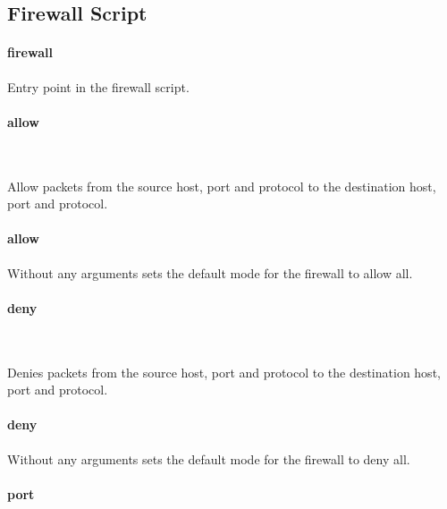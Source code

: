 \subsection{Firewall Script}

\paragraph{firewall}


Entry point in the firewall script.

\paragraph{allow}

\\
\statement*{[from [, port] [, proto]]}

Allow packets from the source host, port and protocol to the destination
host, port and protocol.

\paragraph{allow}


Without any arguments sets the default mode for the firewall to allow all.

\paragraph{deny}

\\
\statement*{[from [, port] [, proto]]}

Denies packets from the source host, port and protocol to the destination
host, port and protocol.

\paragraph{deny}


Without any arguments sets the default mode for the firewall to deny all.

\paragraph{port}

